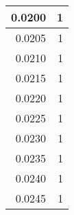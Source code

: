 \begin{tabular}{|r|r|}
           0.0200 &                    1 \\ \hline

           0.0205 &                    1 \\ \hline

           0.0210 &                    1 \\ \hline

           0.0215 &                    1 \\ \hline

           0.0220 &                    1 \\ \hline

           0.0225 &                    1 \\ \hline

           0.0230 &                    1 \\ \hline

           0.0235 &                    1 \\ \hline

           0.0240 &                    1 \\ \hline

           0.0245 &                    1 \\ \hline

\bottomrule
\end{tabular}
